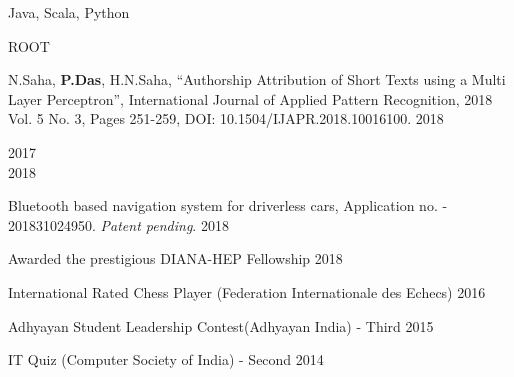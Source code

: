 \documentclass[10pt, letterpaper]{deps1}
\begin{document}
%
%
\vspace{-7pt}
\begin{tightitemize}
    	\item Java, Scala, Python
        \item ROOT
    \end{tightitemize}
\vspace{-7pt}

%
%
\small{\begin{tightitemize}
    \item N.Saha, {\textbf{P.Das}}, H.N.Saha, ``Authorship Attribution of Short Texts using a Multi Layer Perceptron'', International Journal of Applied Pattern Recognition, 2018 Vol. 5 No. 3, Pages 251-259, DOI: 10.1504/IJAPR.2018.10016100. \hfill{2018}
\end{tightitemize}}

%
%
\hfill{2017}\\
\hfill{2018}\vspace{5pt}

%
%
\small{\begin{tightitemize}
    \item Bluetooth based navigation system for driverless cars, Application no. - 201831024950. {\textit{Patent pending}}. \hfill{2018}
\end{tightitemize}}

%
%
\begin{tightitemize}
	\item Awarded the prestigious DIANA-HEP Fellowship \hfill{2018}
	\item International Rated Chess Player (Federation Internationale des Echecs) \hfill{2016}
	\item Adhyayan Student Leadership Contest(Adhyayan India) - Third \hfill{2015}
	\item IT Quiz (Computer Society of India) - Second \hfill{2014}
\end{tightitemize}
\end{document}
